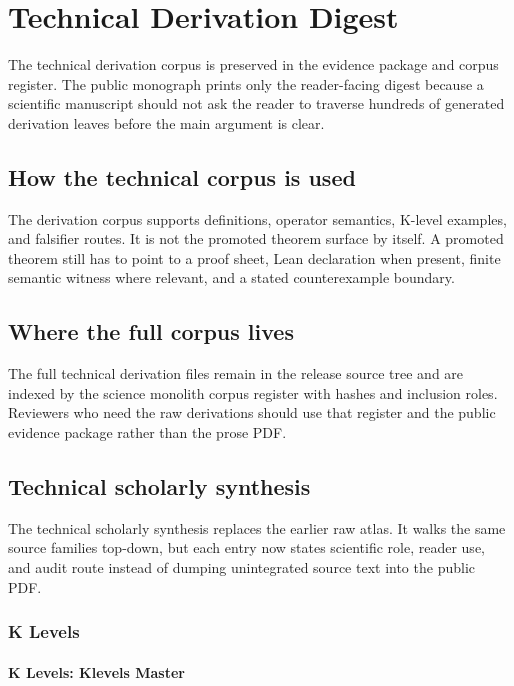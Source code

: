 \section{Technical Derivation Digest}

\label{sec:oc-core-1-3-technical-derivation-atlas}

The technical derivation corpus is preserved in the evidence package and corpus register. The public monograph prints only the reader-facing digest because a scientific manuscript should not ask the reader to traverse hundreds of generated derivation leaves before the main argument is clear.


\subsection{How the technical corpus is used}

The derivation corpus supports definitions, operator semantics, K-level examples, and falsifier routes. It is not the promoted theorem surface by itself. A promoted theorem still has to point to a proof sheet, Lean declaration when present, finite semantic witness where relevant, and a stated counterexample boundary.


\subsection{Where the full corpus lives}

The full technical derivation files remain in the release source tree and are indexed by the science monolith corpus register with hashes and inclusion roles. Reviewers who need the raw derivations should use that register and the public evidence package rather than the prose PDF.


\subsection{Technical scholarly synthesis}

The technical scholarly synthesis replaces the earlier raw atlas. It walks the same source families top-down, but each entry now states scientific role, reader use, and audit route instead of dumping unintegrated source text into the public PDF.


\subsubsection{K Levels}

\paragraph{K Levels: Klevels Master}


